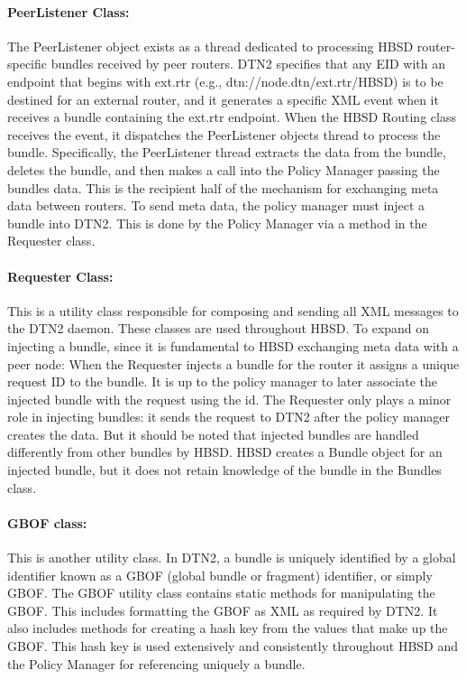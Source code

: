 \paragraph{PeerListener Class:}

The PeerListener object exists as a thread dedicated to processing HBSD
router-specific bundles received by peer routers. DTN2 specifies that any EID
with an endpoint that begins with ext.rtr (e.g., dtn://node.dtn/ext.rtr/HBSD)
is to be destined for an external router, and it generates a specific XML
event when it receives a bundle containing the ext.rtr endpoint. When the
HBSD Routing class receives the event, it dispatches the PeerListener objects
thread to process the bundle. Specifically, the PeerListener thread extracts
the data from the bundle, deletes the bundle, and then makes a call into the
Policy Manager passing the bundles data. This is the recipient half of the
mechanism for exchanging meta data between routers. To send meta data, the
policy manager must inject a bundle into DTN2. This is done by the Policy
Manager via a method in the Requester class.


\paragraph{Requester Class:}

This is a utility class responsible for composing and sending all XML messages
to the DTN2 daemon. These classes are used throughout HBSD.
To expand on injecting a bundle, since it is fundamental to HBSD exchanging
meta data with a peer node: When the Requester injects a bundle for the router
it assigns a unique request ID to the bundle. It is up to the policy manager
to later associate the injected bundle with the request using the id. The
Requester only plays a minor role in injecting bundles: it sends the request
to DTN2 after the policy manager creates the data. But it should be noted that
injected bundles are handled differently from other bundles by HBSD. HBSD
creates a Bundle object for an injected bundle, but it does not retain
knowledge of the bundle in the Bundles class.

\paragraph{GBOF class:}
This is another utility class. In DTN2, a bundle is uniquely identified by a global 
identifier known as a GBOF (global bundle or fragment) identifier, or simply GBOF. The GBOF utility class contains static methods for manipulating the GBOF. This includes formatting the GBOF as XML as required by DTN2. It
also includes methods for creating a hash key from the values that make up the
GBOF. This hash key is used extensively and consistently throughout HBSD and
the Policy Manager for referencing uniquely a bundle.

